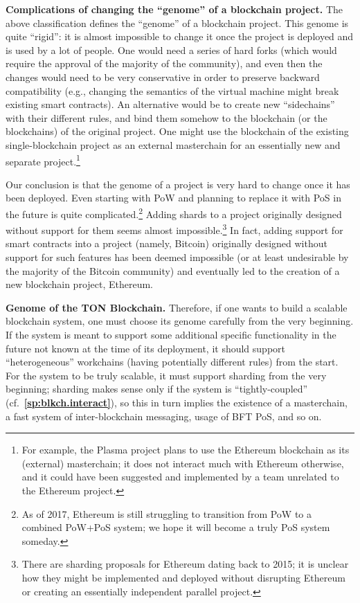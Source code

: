 \documentclass[12pt,oneside]{article}
\def\makepoint#1{\medbreak\noindent{\bf #1.\ }}
\def\nxsubpoint{\refstepcounter{subsubsection}%
  \smallbreak\makepoint{\thesubsubsection}}
\def\refpoint#1{{\rm\textbf{\ref{#1}}}}
\let\ptref=\refpoint
\def\embt(#1.){\textbf{#1.}}
\begin{document}
\nxsubpoint\label{sp:genome.change.never} \embt(Complications of
changing the ``genome'' of a blockchain project.)  The above
classification defines the ``genome'' of a blockchain project. This
genome is quite ``rigid'': it is almost impossible to change it once
the project is deployed and is used by a lot of people. One would need
a series of hard forks (which would require the approval of the
majority of the community), and even then the changes would need to be
very conservative in order to preserve backward compatibility (e.g.,
changing the semantics of the virtual machine might break existing
smart contracts). An alternative would be to create new ``sidechains''
with their different rules, and bind them somehow to the blockchain
(or the blockchains) of the original project. One might use the
blockchain of the existing single-blockchain project as an external
masterchain for an essentially new and separate project.\footnote{For
  example, the Plasma project plans to use the Ethereum blockchain as
  its (external) masterchain; it does not interact much with Ethereum
  otherwise, and it could have been suggested and implemented by a
  team unrelated to the Ethereum project.}

Our conclusion is that the genome of a project is very hard to change
once it has been deployed. Even starting with PoW and planning to
replace it with PoS in the future is quite complicated.\footnote{As of
  2017, Ethereum is still struggling to transition from PoW to a
  combined PoW+PoS system; we hope it will become a truly PoS system
  someday.} Adding shards to a project originally designed without
support for them seems almost impossible.\footnote{There are sharding
  proposals for Ethereum dating back to 2015; it is unclear how they
  might be implemented and deployed without disrupting Ethereum or
  creating an essentially independent parallel project.} In fact,
adding support for smart contracts into a project (namely, Bitcoin)
originally designed without support for such features has been deemed
impossible (or at least undesirable by the majority of the Bitcoin
community) and eventually led to the creation of a new blockchain
project, Ethereum.

\nxsubpoint \embt(Genome of the TON Blockchain.)  Therefore, if one
wants to build a scalable blockchain system, one must choose its
genome carefully from the very beginning. If the system is meant to
support some additional specific functionality in the future not known
at the time of its deployment, it should support ``heterogeneous''
workchains (having potentially different rules) from the start. For
the system to be truly scalable, it must support sharding from the
very beginning; sharding makes sense only if the system is
``tightly-coupled'' (cf.~\ptref{sp:blkch.interact}), so this in turn
implies the existence of a masterchain, a fast system of
inter-blockchain messaging, usage of BFT PoS, and so on.
\end{document}
